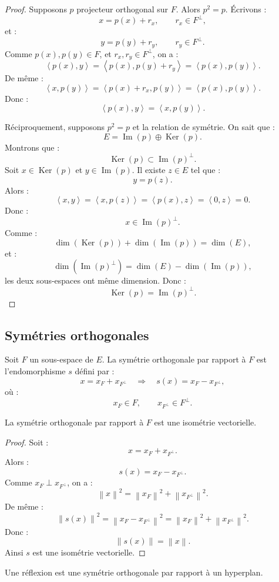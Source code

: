 \documentclass[11pt,a4paper]{article}
\newcommand{\Ker}{\operatorname{Ker}}
\newcommand{\Imf}{\operatorname{Im}}
\newcommand{\norme}[1]{\left\lVert #1\right\rVert}
\newcommand{\scal}[2]{\left\langle #1,#2\right\rangle}
\begin{document}
\begin{proof}
Supposons \(p\) projecteur orthogonal sur \(F\).  
Alors \(p^2=p\).  
Écrivons :
\[
x=p(x)+r_x,
\qquad r_x\in F^\perp,
\]
et :
\[
y=p(y)+r_y,
\qquad r_y\in F^\perp.
\]
Comme \(p(x),p(y)\in F\), et \(r_x,r_y\in F^\perp\), on a :
\[
\scal{p(x)}{y}
=
\scal{p(x)}{p(y)+r_y}
=
\scal{p(x)}{p(y)}.
\]
De même :
\[
\scal{x}{p(y)}
=
\scal{p(x)+r_x}{p(y)}
=
\scal{p(x)}{p(y)}.
\]
Donc :
\[
\scal{p(x)}{y}=\scal{x}{p(y)}.
\]

Réciproquement, supposons \(p^2=p\) et la relation de symétrie.  
On sait que :
\[
E=\Imf(p)\oplus\Ker(p).
\]
Montrons que :
\[
\Ker(p)\subset\Imf(p)^\perp.
\]
Soit \(x\in\Ker(p)\) et \(y\in\Imf(p)\).  
Il existe \(z\in E\) tel que :
\[
y=p(z).
\]
Alors :
\[
\scal{x}{y}
=
\scal{x}{p(z)}
=
\scal{p(x)}{z}
=
\scal{0}{z}
=
0.
\]
Donc :
\[
x\in\Imf(p)^\perp.
\]
Comme :
\[
\dim(\Ker(p))+\dim(\Imf(p))=\dim(E),
\]
et :
\[
\dim(\Imf(p)^\perp)=\dim(E)-\dim(\Imf(p)),
\]
les deux sous-espaces ont même dimension.  
Donc :
\[
\Ker(p)=\Imf(p)^\perp.
\]
\end{proof}

\subsection{Symétries orthogonales}

\begin{definitionbox}
Soit \(F\) un sous-espace de \(E\).  
La symétrie orthogonale par rapport à \(F\) est l'endomorphisme \(s\) défini par :
\[
x=x_F+x_{F^\perp}
\quad\Longrightarrow\quad
s(x)=x_F-x_{F^\perp},
\]
où :
\[
x_F\in F,
\qquad
x_{F^\perp}\in F^\perp.
\]
\end{definitionbox}

\begin{theorembox}
La symétrie orthogonale par rapport à \(F\) est une isométrie vectorielle.
\end{theorembox}

\begin{proof}
Soit :
\[
x=x_F+x_{F^\perp}.
\]
Alors :
\[
s(x)=x_F-x_{F^\perp}.
\]
Comme \(x_F\perp x_{F^\perp}\), on a :
\[
\norme{x}^2=\norme{x_F}^2+\norme{x_{F^\perp}}^2.
\]
De même :
\[
\norme{s(x)}^2
=
\norme{x_F-x_{F^\perp}}^2
=
\norme{x_F}^2+\norme{x_{F^\perp}}^2.
\]
Donc :
\[
\norme{s(x)}=\norme{x}.
\]
Ainsi \(s\) est une isométrie vectorielle.
\end{proof}

\begin{retenirbox}
Une réflexion est une symétrie orthogonale par rapport à un hyperplan.
\end{retenirbox}
\end{document}
